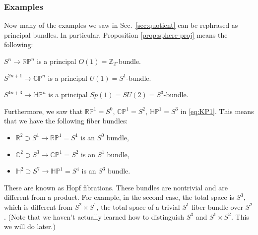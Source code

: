 \documentclass[12pt]{article}
\numberwithin{equation}{section}
\numberwithin{figure}{section}
\theoremstyle{remark}
\def\bC{\mathbb{C}}
\def\bH{\mathbb{H}}
\def\bR{\mathbb{R}}
\def\bZ{\mathbb{Z}}
\def\RP{\mathbb{RP}}
\def\CP{\mathbb{CP}}
\def\HP{\mathbb{HP}}
\begin{document}
\subsubsection{Examples}

Now many of the examples we saw in Sec.~\ref{sec:quotient} can be rephrased as principal bundles.
In particular, Proposition \eqref{prop:sphere-proj} means the following:
\begin{example}
  \label{ex:RPn}
$S^n\to \RP^n$ is a principal $O(1)=\bZ_2$-bundle.
\end{example}

\begin{example}
  \label{ex:CPn}
$S^{2n+1}\to \CP^n$ is a principal $U(1)=S^1$-bundle.
\end{example}

\begin{example}
  \label{ex:HPn}
  $S^{4n+3}\to \HP^n$ is a principal $Sp(1)=SU(2)=S^3$-bundle.
\end{example}

Furthermore, we saw that $\RP^1=S^0$, $\CP^1=S^2$, $\HP^1=S^3$ 
in \eqref{eq:KP1}. 
This means that we have the following fiber bundles:
\begin{itemize}
  \item $\bR^2\supset S^1\to \RP^1=S^1$  is an $S^0$ bundle,
  \item $\bC^2\supset S^3\to \CP^1=S^2$ is an $S^1$ bundle,
  \item $\bH^2\supset S^7\to \HP^1=S^4$ is an $S^3$ bundle.
\end{itemize}

These are known as Hopf fibrations.
These bundles are nontrivial
and are different from a product.
For example, in the second case,
the total space is $S^3$,
which is different from $S^2\times S^1$,
the total space of a trivial $S^1$ fiber bundle over $S^2$.
(Note that we haven't actually learned how to distinguish
$S^3$ and $S^1\times S^2$.
This we will do later.)
\end{document}
